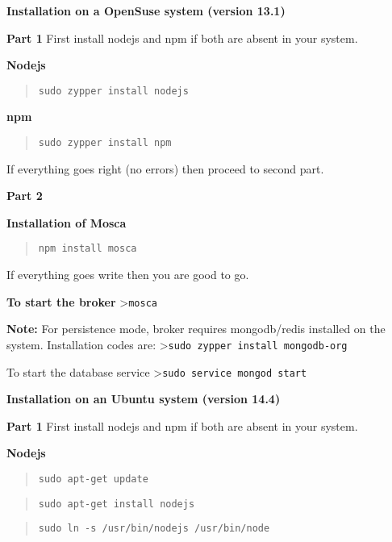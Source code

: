 \documentclass[16pt]{article}
\begin{document}
\textbf{Installation on a OpenSuse system (version
13.1)}

\textbf{Part 1} First install nodejs and npm if both are absent in your
system.

 
\textbf{Nodejs}

\begin{quote}
\texttt{sudo zypper install nodejs}
\end{quote}

\textbf{npm}

\begin{quote}
\texttt{sudo zypper install npm}
\end{quote}

If everything goes right (no errors) then proceed to second part.
 \vspace{0.5cm}

\textbf{Part 2}

\textbf{Installation of Mosca}

\begin{quote}
\texttt{npm install mosca}
\end{quote}

If everything goes write then you are good to go.
 \vspace{0.5cm}

\textbf{To start the broker} \textgreater{}\texttt{mosca}

\textbf{Note:} For persistence mode, broker requires mongodb/redis
installed on the system. Installation codes are:
\textgreater{}\texttt{sudo zypper install mongodb-org}

To start the database service
\textgreater{}\texttt{sudo service mongod start}
 \vspace{0.5cm}


\textbf{Installation on an Ubuntu system (version
14.4)}

\textbf{Part 1} First install nodejs and npm if both are absent in your
system.

\textbf{Nodejs}

\begin{quote}
\texttt{sudo apt-get update}
\end{quote}

\begin{quote}
\texttt{sudo apt-get install nodejs}
\end{quote}

\begin{quote}
\texttt{sudo ln -s /usr/bin/nodejs /usr/bin/node}
\end{quote}
\end{document}

